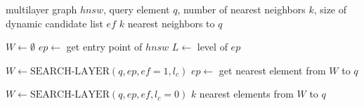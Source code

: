 \begin{algorithm}[H]
    \caption{K-NN-SEARCH \cite{Malkov-Yashunin-2016}}
    \label{alg:hnsw-5}
    \begin{algorithmic}[1]
        \Require multilayer graph $hnsw$, query element $q$, number of nearest neighbors $k$, size of dynamic candidate list $ef$
        \Ensure $k$ nearest neighbors to $q$
        
        \State $W \gets \emptyset$ 
        \State $ep \gets$ get entry point of $hnsw$
        \State $L \gets$ level of $ep$ 
        
            \State $W \gets \text{SEARCH-LAYER}(q, ep, ef=1, l_c)$
            \State $ep \gets$ get nearest element from $W$ to $q$
        \EndFor
        
        \State $W \gets \text{SEARCH-LAYER}(q, ep, ef, l_c=0)$
        \State \Return $k$ nearest elements from $W$ to $q$
        
    \end{algorithmic}
\end{algorithm}